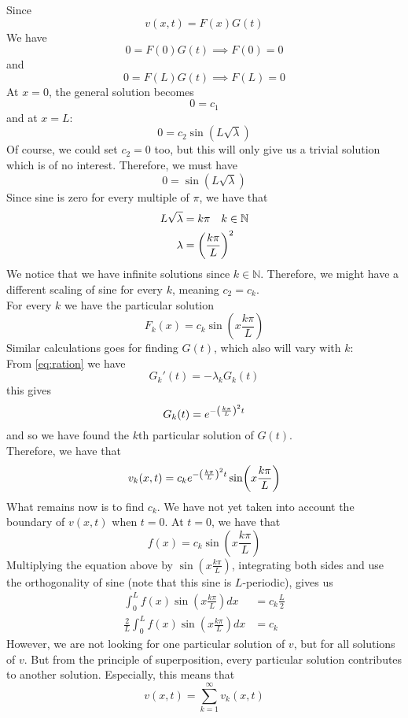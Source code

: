 \documentclass[12pt,english,a4paper]{article}
\begin{document}
Since
\[
v(x,t) = F(x)G(t)
\]
We have
\[
0 = F(0)G(t) \implies F(0) = 0
\]
and
\[
0 = F(L)G(t) \implies F(L) = 0
\]
At \(x = 0\), the general solution becomes
\[
0 = c_1
\]
and at \(x = L\):
\[
0 =  c_2\sin(L\sqrt{\lambda})
\]
Of course, we could set \(c_2 = 0\) too, but this will only give us a trivial solution which is of no interest. Therefore, we must have
\[
0 = \sin(L\sqrt{\lambda})
\]
Since sine is zero for every multiple of \(\pi\), we have that
\begin{align*}
L\sqrt{\lambda} &= k\pi \quad k\in \mathbb{N}\\
\lambda &= \qty(\frac{k \pi}{L})^2
\end{align*}
We notice that we have infinite solutions since \(k \in \mathbb{N}\). Therefore, we might have a different scaling of sine for every \(k\), meaning \(c_2 = c_k\).\\  For every \(k\) we have the particular solution
\[
F_k(x) = c_k\sin(x\frac{k \pi}{L})
\]
Similar calculations goes for finding \(G(t)\), which also will vary with \(k\):\\
From \vref{eq:ration} we have
\[
G_k'(t) = -\lambda_k G_k(t)
\]
this gives
\[
G_k(t) = e^{-\qty(\frac{k \pi}{L})^2t}
\]
and so we have found the \(k\)th particular solution of \(G(t)\). \\
Therefore, we have that
\[
v_k(x,t) = c_ke^{-\qty(\frac{k \pi}{L})^2t}\sin(x\frac{k \pi}{L})
\]
What remains now is to find \(c_k\). We have not yet taken into account the boundary of \(v(x,t)\) when \(t = 0\). At \(t = 0\), we have that
\[
f(x) = c_k\sin(x\frac{k \pi}{L})
\]
Multiplying  the equation above by \(\sin(x\frac{k \pi}{L})\), integrating both sides and use the orthogonality of sine (note that this sine is \(L\)-periodic), gives us
\begin{align*}
\int_0^Lf(x)\sin(x\frac{k \pi}{L})dx &= c_k\frac{L}{2} \\
\frac{2}{L}\int_0^Lf(x)\sin(x\frac{k \pi}{L})dx &= c_k
\end{align*}
However, we are not looking for one particular solution of \(v\), but for all solutions of \(v\). But from the principle of superposition, every particular solution contributes to another solution. Especially, this means that
\[
v(x,t) = \sum_{k=1}^\infty v_k(x,t)
\]
\end{document}
